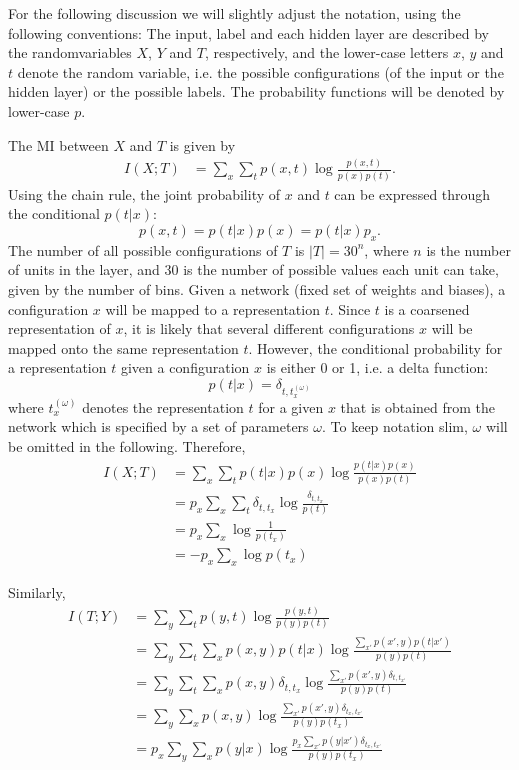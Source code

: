 \documentclass[12pt]{report}
\begin{document}
For the following discussion we will slightly adjust the notation, using the following conventions: The input, label and each hidden layer are described by the randomvariables $X$, $Y$ and $T$, respectively, and the lower-case letters $x$, $y$ and $t$ denote the random variable, i.e. the possible configurations (of the input or the hidden layer) or the possible labels. The probability functions will be denoted by lower-case $p$.

The MI between $X$ and $T$ is given by
\begin{align}
I(X;T) &= \sum \limits_{x} \sum \limits_{t} p(x,t) \log\frac{p(x,t)}{p(x)p(t)}.
\end{align}
Using the chain rule, the joint probability of $x$ and $t$ can be expressed through the conditional $p(t|x)$:
\begin{equation}
p(x,t) = p(t|x)p(x) = p(t|x) p_x.
\end{equation}
The number of all possible configurations of $T$ is $|T| = 30^n$, where $n$ is the number of units in the layer, and 30 is the number of possible values each unit can take, given by the number of bins. Given a network (fixed set of weights and biases), a configuration $x$ will be mapped to a representation $t$. Since $t$ is a coarsened representation of $x$, it is likely that several different configurations $x$ will be mapped onto the same representation $t$. However, the conditional probability for a representation $t$ given a configuration $x$ is either 0 or 1, i.e. a delta function:
\begin{equation}
p(t|x) = \delta_{t,t^{(\omega)}_x}
\end{equation}
where $t^{(\omega)}_x$ denotes the representation $t$ for a given $x$ that is obtained from the network which is specified by a set of parameters $\omega$. To keep notation slim, $\omega$ will be omitted in the following. Therefore,
\begin{align}
I(X;T) &= \sum \limits_{x} \sum \limits_{t} p(t|x) p(x) \log\frac{p(t|x)p(x)}{p(x)p(t)}\\
   &= p_x \sum \limits_{x} \sum \limits_{t} \delta_{t,t_x} \log\frac{\delta_{t,t_x}}{p(t)}\\
   &= p_x \sum \limits_{x} \log\frac{1}{p(t_x)}\\
   &= - p_x \sum \limits_{x} \log p(t_x)   
\end{align}

Similarly,
\begin{align}
I(T;Y) &= \sum \limits_{y} \sum \limits_{t} p(y,t) \log\frac{p(y,t)}{p(y)p(t)}\\
&= \sum \limits_{y} \sum \limits_{t} \sum \limits_{x} p(x,y) p(t|x) \log\frac{ \sum \limits_{x'} p(x',y) p(t|x') }{p(y)p(t)}\\
&= \sum \limits_{y} \sum \limits_{t} \sum \limits_{x} p(x,y) \delta_{t,t_x} \log\frac{ \sum \limits_{x'} p(x',y) \delta_{t,t_{x'}} }{p(y)p(t)}\\
&= \sum \limits_{y} \sum \limits_{x} p(x,y) \log\frac{ \sum \limits_{x'} p(x',y) \delta_{t_x,t_{x'}} }{p(y)p(t_x)}\\
&= p_x \sum \limits_{y} \sum \limits_{x} p(y|x) \log\frac{ p_x \sum \limits_{x'} p(y|x') \delta_{t_x,t_{x'}} }{p(y)p(t_x)} \label{eq:here}
\end{align}
\end{document}
